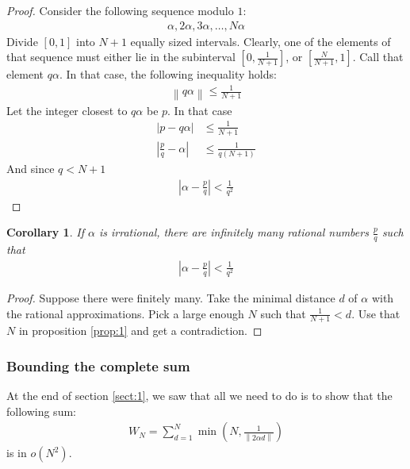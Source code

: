\documentclass[12pt, titlepage]{article}
\newtheorem{cor}[thm]{Corollary}
\theoremstyle{definition}
\newcommand{\norm}[1]{\left\lVert#1\right\rVert}
\begin{document}
\begin{proof}
    Consider the following sequence modulo $1$:
    \begin{align*}
        \alpha, 2\alpha, 3\alpha, \ldots, N\alpha
    \end{align*}
    Divide $[0,1]$ into $N+1$ equally sized intervals. Clearly, one of the elements of that sequence must either lie in the subinterval $\left[ 0, \frac{1}{N+1} \right]$, or $\left[ \frac{N}{N+1}, 1 \right]$. Call that element $q\alpha$. In that case, the following inequality holds:
    \begin{align*}
        \norm{q\alpha} \leq \frac{1}{N+1}
    \end{align*}
    Let the integer closest to $q\alpha$ be $p$. In that case
    \begin{align*}
        \left| p - q\alpha \right| &\leq \frac{1}{N+1} \\
        \left| \frac{p}{q} - \alpha \right| &\leq \frac{1}{q(N+1)}
    \end{align*}
    And since $q < N+1$
    \begin{align*}
        \left| \alpha - \frac{p}{q} \right| < \frac{1}{q^2}
    \end{align*}
\end{proof}

\begin{cor}
    If $\alpha$ is irrational, there are infinitely many rational numbers $\frac{p}{q}$ such that
    \begin{align*}
        \left| \alpha - \frac{p}{q} \right| < \frac{1}{q^2}
    \end{align*}
\end{cor}

\begin{proof}
    Suppose there were finitely many. Take the minimal distance $d$ of $\alpha$ with the rational approximations. Pick a large enough $N$ such that $\frac{1}{N+1} < d$. Use that $N$ in proposition \ref{prop:1} and get a contradiction.
\end{proof}

\subsubsection{Bounding the complete sum\cite{weyl}}
At the end of section \ref{sect:1}, we saw that all we need to do is to show that the following sum:
\begin{align*}
    W_N = \sum_{d=1}^{N} \min\left( N, \frac{1}{\norm{2\alpha d}} \right)
\end{align*}
is in $o(N^2)$.
\end{document}
